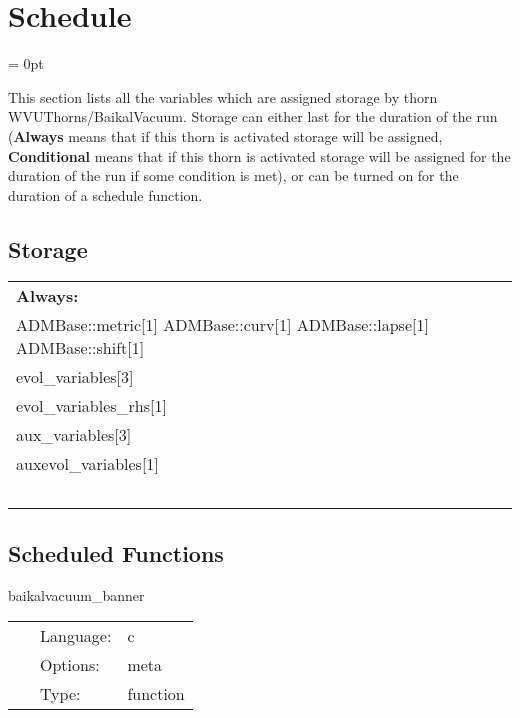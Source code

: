 
\section{Schedule} 


\parskip = 0pt


\noindent This section lists all the variables which are assigned storage by thorn WVUThorns/BaikalVacuum.  Storage can either last for the duration of the run ({\bf Always} means that if this thorn is activated storage will be assigned, {\bf Conditional} means that if this thorn is activated storage will be assigned for the duration of the run if some condition is met), or can be turned on for the duration of a schedule function.


\subsection*{Storage}

\hspace{5mm}

 \begin{tabular*}{160mm}{ll} 

{\bf Always:}&  ~ \\ 
 ADMBase::metric[1] ADMBase::curv[1] ADMBase::lapse[1] ADMBase::shift[1] & ~\\ 
 evol\_variables[3] & ~\\ 
 evol\_variables\_rhs[1] & ~\\ 
 aux\_variables[3] & ~\\ 
 auxevol\_variables[1] & ~\\ 
~ & ~\\ 
\end{tabular*} 


\subsection*{Scheduled Functions}
\vspace{5mm}


\hspace{5mm} baikalvacuum\_banner 

\hspace{5mm}{\it output ascii art banner } 


\hspace{5mm}

 \begin{tabular*}{160mm}{cll} 
~ & Language:  & c \\ 
~ & Options:  & meta \\ 
~ & Type:  & function \\ 
\end{tabular*} 


